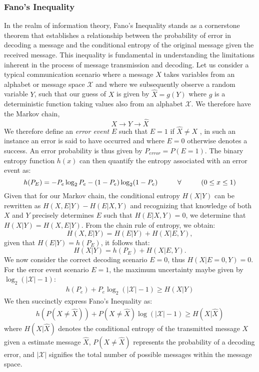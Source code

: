 \documentclass[12pt]{article}
\begin{document}
		\subsubsection{Fano's Inequality}
		In the realm of information theory, Fano's Inequality stands as a cornerstone theorem that establishes a relationship between the probability of error in decoding a message and the conditional entropy of the original message given the received message. This inequality is fundamental in understanding the limitations inherent in the process of message transmission and decoding.  Let us consider a typical communication scenario where a message $X$  takes variables from an alphabet  or message space $\mathcal{X}$ and where we subsequently observe  a random variable $Y$, such that our guess of $X$ is given by $\hat{X} = g(Y)$ where $g$ is a deterministic function taking values also from an alphabet  $\mathcal{X}$. We therefore have the Markov chain,
		\begin{equation}
			X \rightarrow Y \rightarrow \hat{X}
		\end{equation}
		We therefore define an \emph{error event} \(E\) such that \(E = 1\) if \( \hat{X} \neq X\) , in such an instance an error is said to have occurred  and where \(E = 0\) otherwise  denotes a success. An error probability is thus given by \(P_{error} = P(E = 1)\). The {binary entropy} function $h(x) $ can then quantify the entropy associated with an error event as:
		\begin{equation}
			h(P_E) = -P_e \log_2 P_e - (1 - P_e) \log_2 (1 - P_e) \hspace{1.0cm} \forall \hspace{1.0cm} (0 \leq x \leq 1)
		\end{equation}
		Given that for our Markov chain, the conditional entropy \(H(X|Y)\) can be rewritten as \(H(X, E|Y) - H(E|X, Y)\) and recognizing that knowledge of both \(X\) and \(Y\) precisely determines \(E\)  such that \(H(E|X, Y) = 0\), we determine that \(H(X|Y) = H(X, E|Y)\). From the chain rule of entropy, we obtain:
		\begin{equation}
			H(X, E|Y) = H(E|Y) + H(X|E, Y),
		\end{equation}
		given that \(H(E|Y) = h(P_E)\), it follows that:
		\begin{equation}
			H(X|Y) = h(P_E) + H(X|E, Y).
		\end{equation}
		We now consider the correct decoding scenario \(E = 0\), thus \(H(X|E=0, Y) = 0\). For the error event scenario \(E = 1\), the maximum uncertainty maybe given by \(\log_2 (|\mathcal{X}| - 1)\):
		\begin{align*}
			h(P_e) + P_e \log_2 (|\mathcal{X}| - 1)  \geq H(X|Y)  
		\end{align*}
		We then succinctly express Fano's Inequality  as:
		\begin{align*}
			h(P(X \neq \hat{X})) + P(X \neq \hat{X}) \log (|\mathcal{X}| - 1)  \geq H(X | \hat{X})
		\end{align*}
		where \(H(X|\hat{X})\) denotes the conditional entropy of the transmitted message \(X\) given a estimate message \(\hat{X}\), \( P(X \neq \hat{X})\) represents the probability of a decoding error, and \(|\mathcal{X}|\) signifies the total number of possible messages within the message space.
	
\end{document}
